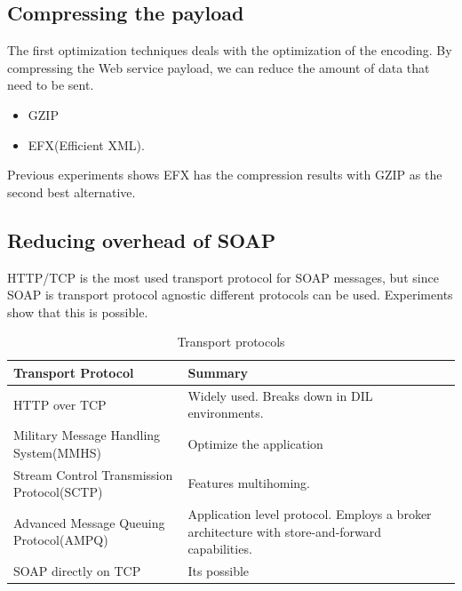 \documentclass[USenglish]{ifimaster}
\begin{document}
\subsection{Compressing the payload}
The first optimization techniques deals with the optimization of the encoding. By compressing the Web service payload, we can reduce the amount of data that need to be sent.
\begin{itemize}
\item GZIP
\item EFX(Efficient XML).
\end{itemize}
Previous experiments shows EFX has the compression results with GZIP as the second best alternative\cite{johnsen-trude-compression-techniqes}.

\subsection{Reducing overhead of SOAP}
HTTP/TCP is the most used transport protocol for SOAP messages, but since SOAP is transport protocol agnostic different protocols can be used. Experiments show that this is possible.


\begin{table}[h]
\begin{tabularx}{\textwidth}{| X | X |}
\hline
  \textbf{Transport Protocol} & \textbf{Summary} \\ \hline
  HTTP over TCP & Widely used. Breaks down in DIL environments.\\ \hline
  Military Message Handling System(MMHS) & Optimize the application\\ \hline
  Stream Control Transmission Protocol(SCTP) & Features multihoming. \\ \hline
  Advanced Message Queuing Protocol(AMPQ) & Application level protocol. Employs
  a broker architecture with store-and-forward capabilities. \\ \hline
  SOAP directly on TCP & Its possible \\ \hline
\end{tabularx}
\caption{Transport protocols}
\end{table}
\end{document}
